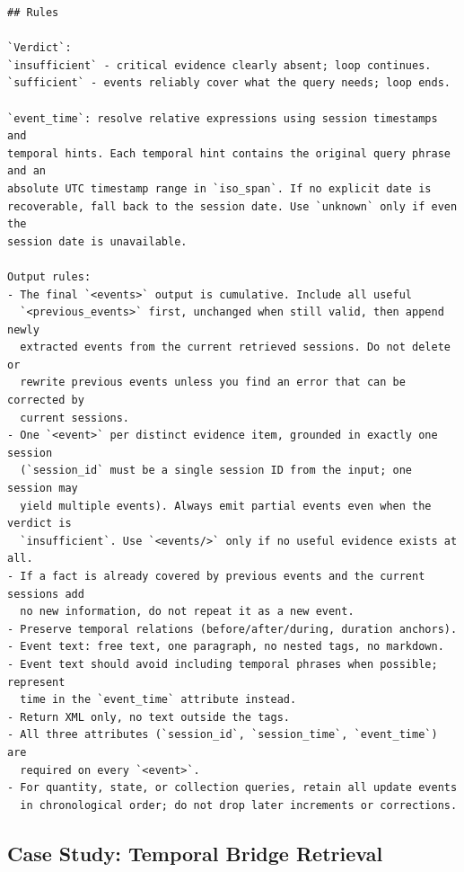 \begin{tcolorbox}[appendixexample,title={Prompt Template of Synthesizer: $P_{\mathrm{synth}}$}]
\begin{Verbatim}[fontsize=\scriptsize,formatcom=\linespread{0.82}\selectfont,breaklines=true,breakanywhere=true]
## Rules

`Verdict`:
`insufficient` - critical evidence clearly absent; loop continues.
`sufficient` - events reliably cover what the query needs; loop ends.

`event_time`: resolve relative expressions using session timestamps and
temporal hints. Each temporal hint contains the original query phrase and an
absolute UTC timestamp range in `iso_span`. If no explicit date is
recoverable, fall back to the session date. Use `unknown` only if even the
session date is unavailable.

Output rules:
- The final `<events>` output is cumulative. Include all useful
  `<previous_events>` first, unchanged when still valid, then append newly
  extracted events from the current retrieved sessions. Do not delete or
  rewrite previous events unless you find an error that can be corrected by
  current sessions.
- One `<event>` per distinct evidence item, grounded in exactly one session
  (`session_id` must be a single session ID from the input; one session may
  yield multiple events). Always emit partial events even when the verdict is
  `insufficient`. Use `<events/>` only if no useful evidence exists at all.
- If a fact is already covered by previous events and the current sessions add
  no new information, do not repeat it as a new event.
- Preserve temporal relations (before/after/during, duration anchors).
- Event text: free text, one paragraph, no nested tags, no markdown.
- Event text should avoid including temporal phrases when possible; represent
  time in the `event_time` attribute instead.
- Return XML only, no text outside the tags.
- All three attributes (`session_id`, `session_time`, `event_time`) are
  required on every `<event>`.
- For quantity, state, or collection queries, retain all update events
  in chronological order; do not drop later increments or corrections.

\end{Verbatim}
\end{tcolorbox}

\subsection{Case Study: Temporal Bridge Retrieval}
\label{app:case-study-temporal-bridge}

